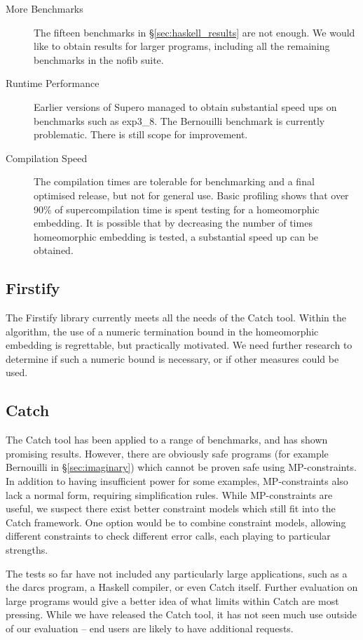 \begin{description}
\item[More Benchmarks] The fifteen benchmarks in \S\ref{sec:haskell_results} are not enough. We would like to obtain results for larger programs, including all the remaining benchmarks in the nofib suite.
\item[Runtime Performance] Earlier versions of Supero \cite{me:supero_ifl} managed to obtain substantial speed ups on benchmarks such as exp3\_8. The Bernouilli benchmark is currently problematic. There is still scope for improvement.
\item[Compilation Speed] The compilation times are tolerable for benchmarking and a final optimised release, but not for general use. Basic profiling shows that over 90\% of supercompilation time is spent testing for a homeomorphic embedding. It is possible that by decreasing the number of times homeomorphic embedding is tested, a substantial speed up can be obtained.
\end{description}

\subsection{Firstify}

The Firstify library currently meets all the needs of the Catch tool. Within the algorithm, the use of a numeric termination bound in the homeomorphic embedding is regrettable, but practically motivated. We need further research to determine if such a numeric bound is necessary, or if other measures could be used.

\subsection{Catch}

The Catch tool has been applied to a range of benchmarks, and has shown promising results. However, there are obviously safe programs (for example Bernouilli in \S\ref{sec:imaginary}) which cannot be proven safe using MP-constraints. In addition to having insufficient power for some examples, MP-constraints also lack a normal form, requiring simplification rules. While MP-constraints are useful, we suspect there exist better constraint models which still fit into the Catch framework. One option would be to combine constraint models, allowing different constraints to check different error calls, each playing to particular strengths.

The tests so far have not included any particularly large applications, such as a the darcs program, a Haskell compiler, or even Catch itself. Further evaluation on large programs would give a better idea of what limits within Catch are most pressing. While we have released the Catch tool, it has not seen much use outside of our evaluation -- end users are likely to have additional requests.


